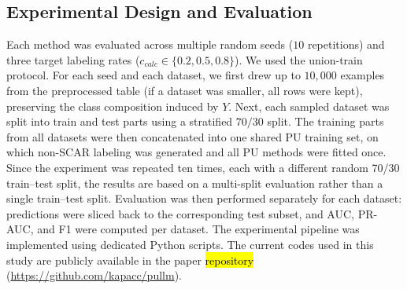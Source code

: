 \documentclass[applsci,article,accept,pdftex,moreauthors]{Definitions/mdpi}
\newcommand{\rev}[1]{{#1}}
\begin{document}
\subsection{Experimental Design and Evaluation}

Each method was evaluated across multiple random seeds ($10$ repetitions) and three target labeling rates ($c_{calc} \in \{0.2, 0.5, 0.8\}$). We used the union-train protocol. For each seed and each dataset, we first drew up to $10{,}000$ examples from the preprocessed table (if a dataset was smaller, all rows were kept), preserving the class composition induced by $Y$. Next, each sampled dataset was split into train and test parts using a stratified $70/30$ split. The training parts from all datasets were then concatenated into one shared PU training set, on which non-SCAR labeling was generated and all PU methods were fitted once. \rev{Since the experiment was repeated ten times, each with a different random 70/30 train--test split, the results are based on a multi-split evaluation rather than a single train--test split.} Evaluation was then performed separately for each dataset: predictions were sliced back to the corresponding test subset, and AUC, PR-AUC, and F1 were computed per dataset. The experimental pipeline was implemented using dedicated Python scripts. The current codes used in this study are publicly available in the paper \hl{repository} %
 (\url{https://github.com/kapacc/pullm}).
\end{document}
